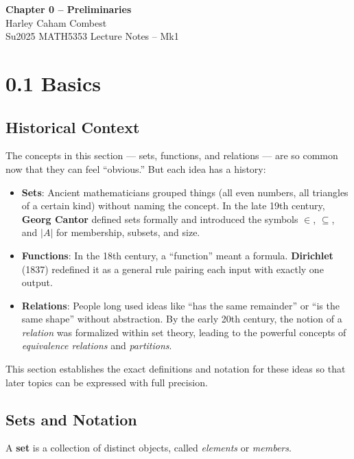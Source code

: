 \documentclass[12pt]{article}
\theoremstyle{definition}
\begin{document}
\begin{center}
\Large\textbf{Chapter 0 – Preliminaries} \\
\large Harley Caham Combest \\
\large Su2025 MATH5353 Lecture Notes – Mk1
\end{center}

\vspace{1em}

\section*{0.1 Basics}

\subsection*{Historical Context}

The concepts in this section --- sets, functions, and relations --- are so common now that they can feel ``obvious.'' 
But each idea has a history:

\begin{itemize}
    \item \textbf{Sets}: Ancient mathematicians grouped things (all even numbers, all triangles of a certain kind) without naming the concept. 
    In the late 19th century, \textbf{Georg Cantor} defined sets formally and introduced the symbols \( \in \), \( \subseteq \), and \( |A| \) for membership, subsets, and size.
    \item \textbf{Functions}: In the 18th century, a ``function'' meant a formula. 
    \textbf{Dirichlet} (1837) redefined it as a general rule pairing each input with exactly one output.
    \item \textbf{Relations}: People long used ideas like ``has the same remainder'' or ``is the same shape'' without abstraction. 
    By the early 20th century, the notion of a \emph{relation} was formalized within set theory, leading to the powerful concepts of \emph{equivalence relations} and \emph{partitions}.
\end{itemize}

This section establishes the exact definitions and notation for these ideas so that later topics can be expressed with full precision.

\subsection*{Sets and Notation}

A \textbf{set} is a collection of distinct objects, called \emph{elements} or \emph{members}.
\end{document}
